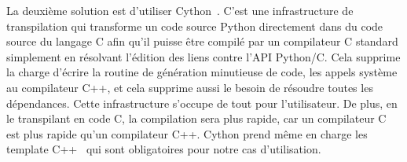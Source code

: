 La deuxième solution est d'utiliser Cython~\parencite{behnel.2010.cython}. C'est une infrastructure de transpilation qui
transforme un code source Python directement dans du code source du langage C afin qu'il puisse être compilé par un
compilateur C standard simplement en résolvant l'édition des liens contre l'API Python/C. Cela supprime la charge
d'écrire la routine de génération minutieuse de code, les appels système au compilateur C++, et cela supprime aussi le
besoin de résoudre toutes les dépendances. Cette infrastructure s'occupe de tout pour l'utilisateur. De plus, en le
transpilant en code C, la compilation sera plus rapide, car un compilateur C est plus rapide qu'un compilateur C++.
Cython prend même en charge les template C++~\parencite{behnel.2022.cython-template} qui sont obligatoires pour notre
cas d'utilisation.

